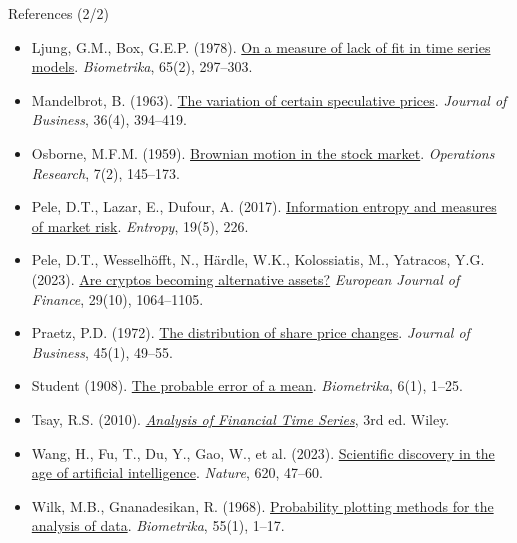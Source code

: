 \begin{frame}{References (2/2)}
\itemsize{\tiny}
\begin{itemize}
    \item Ljung, G.M., Box, G.E.P. (1978). \href{https://doi.org/10.1093/biomet/65.2.297}{On a measure of lack of fit in time series models}. \textit{Biometrika}, 65(2), 297--303.
    \item Mandelbrot, B. (1963). \href{https://doi.org/10.1086/294632}{The variation of certain speculative prices}. \textit{Journal of Business}, 36(4), 394--419.
    \item Osborne, M.F.M. (1959). \href{https://doi.org/10.1287/opre.7.2.145}{Brownian motion in the stock market}. \textit{Operations Research}, 7(2), 145--173.
    \item Pele, D.T., Lazar, E., Dufour, A. (2017). \href{https://doi.org/10.3390/e19050226}{Information entropy and measures of market risk}. \textit{Entropy}, 19(5), 226.
    \item Pele, D.T., Wesselhöfft, N., Härdle, W.K., Kolossiatis, M., Yatracos, Y.G. (2023). \href{https://doi.org/10.1080/1351847X.2021.1960403}{Are cryptos becoming alternative assets?} \textit{European Journal of Finance}, 29(10), 1064--1105.
    \item Praetz, P.D. (1972). \href{https://doi.org/10.1086/295425}{The distribution of share price changes}. \textit{Journal of Business}, 45(1), 49--55.
    \item Student (1908). \href{https://doi.org/10.1093/biomet/6.1.1}{The probable error of a mean}. \textit{Biometrika}, 6(1), 1--25.
    \item Tsay, R.S. (2010). \href{https://doi.org/10.1002/9780470644560}{\textit{Analysis of Financial Time Series}}, 3rd ed. Wiley.
    \item Wang, H., Fu, T., Du, Y., Gao, W., et al. (2023). \href{https://doi.org/10.1038/s41586-023-06221-2}{Scientific discovery in the age of artificial intelligence}. \textit{Nature}, 620, 47--60.
    \item Wilk, M.B., Gnanadesikan, R. (1968). \href{https://doi.org/10.1093/biomet/55.1.1}{Probability plotting methods for the analysis of data}. \textit{Biometrika}, 55(1), 1--17.
\end{itemize}
\end{frame}


